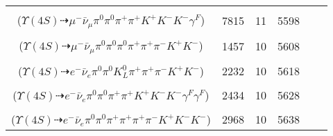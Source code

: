 \documentclass[landscape]{article}
\newcounter{rownumbers}
\newcommand\rn{\stepcounter{rownumbers}\arabic{rownumbers}}
\newcommand{\EOL}{\\} %
\newcommand{\topoTags}[1]{#1} %
\begin{document}
\begin{longtable}{clcccc}
\rn & \makecell[l]{ $ 
\Upsilon(4S) \rightarrow B^{0} \bar{B}^{0} ,
B^{0} \rightarrow \pi^{0} K^{+} K^{-} \gamma^{F} ,
\bar{B}^{0} \rightarrow \mu^{-} \bar{\nu}_{\mu} D^{*+} ,
D^{*+} \rightarrow \pi^{+} D^{0} ,
D^{0} \rightarrow \pi^{0} \pi^{+} K^{-} 
$ \\ ($
\Upsilon(4S) \dashrightarrow \mu^{-} \bar{\nu}_{\mu} \pi^{0} \pi^{0} \pi^{+} \pi^{+} K^{+} K^{-} K^{-} \gamma^{F} 
$) } & \topoTags{7815 & }11 & 5598 \EOL

\rn & \makecell[l]{ $ 
\Upsilon(4S) \rightarrow B^{0} \bar{B}^{0} ,
B^{0} \rightarrow \pi^{0} K^{+} K^{-} ,
\bar{B}^{0} \rightarrow \mu^{-} \bar{\nu}_{\mu} D^{*+} ,
D^{*+} \rightarrow \pi^{0} D^{+} ,
D^{+} \rightarrow \pi^{0} \pi^{+} K_{S}^{0} ,
K_{S}^{0} \rightarrow \pi^{+} \pi^{-} 
$ \\ ($
\Upsilon(4S) \dashrightarrow \mu^{-} \bar{\nu}_{\mu} \pi^{0} \pi^{0} \pi^{0} \pi^{+} \pi^{+} \pi^{-} K^{+} K^{-} 
$) } & \topoTags{1457 & }10 & 5608 \EOL

\rn & \makecell[l]{ $ 
\Upsilon(4S) \rightarrow B^{0} \bar{B}^{0} ,
B^{0} \rightarrow \pi^{0} K^{+} K^{-} ,
\bar{B}^{0} \rightarrow e^{-} \bar{\nu}_{e} D^{*+} ,
D^{*+} \rightarrow \pi^{+} D^{0} ,
D^{0} \rightarrow K_{L}^{0} \omega ,
\omega \rightarrow \pi^{0} \pi^{+} \pi^{-} 
$ \\ ($
\Upsilon(4S) \dashrightarrow e^{-} \bar{\nu}_{e} \pi^{0} \pi^{0} K_{L}^{0} \pi^{+} \pi^{+} \pi^{-} K^{+} K^{-} 
$) } & \topoTags{2232 & }10 & 5618 \EOL

\rn & \makecell[l]{ $ 
\Upsilon(4S) \rightarrow B^{0} \bar{B}^{0} ,
B^{0} \rightarrow \pi^{0} K^{+} K^{-} ,
\bar{B}^{0} \rightarrow e^{-} \bar{\nu}_{e} D^{*+} \gamma^{F} \gamma^{F} ,
D^{*+} \rightarrow \pi^{+} D^{0} ,
D^{0} \rightarrow \pi^{0} \pi^{+} K^{-} 
$ \\ ($
\Upsilon(4S) \dashrightarrow e^{-} \bar{\nu}_{e} \pi^{0} \pi^{0} \pi^{+} \pi^{+} K^{+} K^{-} K^{-} \gamma^{F} \gamma^{F} 
$) } & \topoTags{2434 & }10 & 5628 \EOL

\rn & \makecell[l]{ $ 
\Upsilon(4S) \rightarrow B^{0} \bar{B}^{0} ,
B^{0} \rightarrow \pi^{0} K^{+} K^{-} ,
\bar{B}^{0} \rightarrow e^{-} \bar{\nu}_{e} D^{*+} ,
D^{*+} \rightarrow \pi^{+} D^{0} ,
D^{0} \rightarrow \pi^{+} \omega K^{-} ,
\omega \rightarrow \pi^{0} \pi^{+} \pi^{-} 
$ \\ ($
\Upsilon(4S) \dashrightarrow e^{-} \bar{\nu}_{e} \pi^{0} \pi^{0} \pi^{+} \pi^{+} \pi^{+} \pi^{-} K^{+} K^{-} K^{-} 
$) } & \topoTags{2968 & }10 & 5638 \EOL


\end{longtable}
\end{document}
